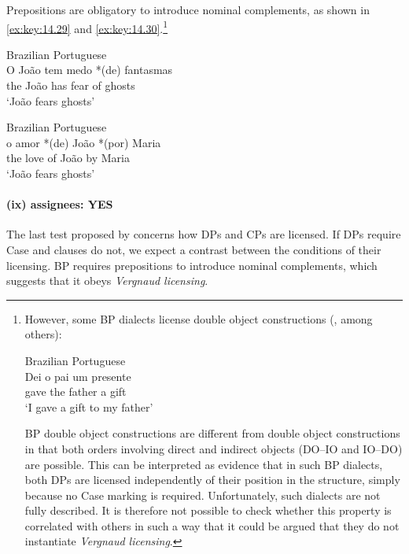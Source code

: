\documentclass[output=paper]{langsci/langscibook}
\begin{document}
Prepositions are obligatory to introduce nominal complements, as shown in
\eqref{ex:key:14.29} and \eqref{ex:key:14.30}.\footnote{However, some \gls{BP}
    dialects license double object constructions
    (\citealt{Scher1996,LucchesiMello2009}, among others):

\begin{exe}
    Brazilian Portuguese\\
    \gll    Dei o pai um presente\\
            gave the father a gift\\
    \glt    ‘I gave a gift to my father’
\end{exe}

\gls{BP} double object constructions are different from  double object
constructions in that both orders involving direct and indirect objects
(\gls{DO}--\gls{IO} and \gls{IO}--\gls{DO}) are
possible. This can be interpreted as evidence that in such \gls{BP} dialects,
both DPs are licensed independently of their position in the structure, simply
because no Case marking is required.  Unfortunately, such dialects are not
fully described. It is therefore not possible to check whether this property is
correlated with others in such a way that it could be argued that they do not
instantiate \emph{Vergnaud licensing}.}\newpage

\ea\label{ex:key:14.29}Brazilian Portuguese\\
    \gll    \llap{*}O João tem medo *(de) fantasmas\\
            the João has fear \hphantom{*(}of ghosts\\
    \glt    \enquote*{João fears ghosts}
\z

\ea\label{ex:key:14.30}Brazilian Portuguese\\
    \gll    o amor *(de) João *(por) Maria\\
            the love \hphantom{*(}of João \hphantom{*(}by Maria\\
    \glt    \enquote*{João fears ghosts}
\z

\paragraph*{(ix) assignees: YES}

The last test proposed by \citeauthor{SheevanderWal2018} concerns how DPs and
CPs are licensed. If DPs require Case and clauses do not, we expect a contrast
between the conditions of their licensing. \gls{BP} requires prepositions to
introduce nominal complements, which suggests that it obeys \emph{Vergnaud
licensing}.
\end{document}
